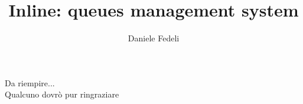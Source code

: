 \documentclass[Lau,binding=0.6cm]{sapthesis}
\title{Inline: queues management system}
\author{Daniele Fedeli}
\begin{document}
	
	\frontmatter
	
	\maketitle
	
	\dedication{Citazione ancora non decisa}
	
	\begin{acknowledgments}
		Da riempire...\\
		Qualcuno dovrò pur ringraziare
	\end{acknowledgments}
	{\tableofcontents}
	\listoffigures
	\listoftables
	\mainmatter

	
	
	
	
	
	
	\backmatter
	\cleardoublepage
	
\end{document}
